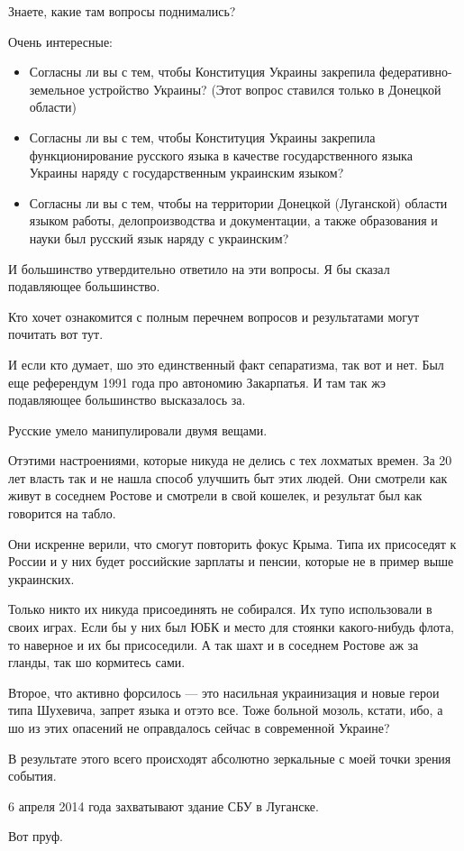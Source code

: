 Знаете, какие там вопросы поднимались?

Очень интересные:	

\begin{itemize} %

\item Согласны ли вы с тем, чтобы Конституция Украины закрепила
федеративно-земельное устройство Украины? (Этот вопрос ставился только в
Донецкой области)

\item Согласны ли вы с тем, чтобы Конституция Украины закрепила
функционирование русского языка в качестве государственного языка Украины
наряду с государственным украинским языком?

\item Согласны ли вы с тем, чтобы на территории Донецкой (Луганской) области
языком работы, делопроизводства и документации, а также образования и науки был
русский язык наряду с украинским?

\end{itemize} %

И большинство утвердительно ответило на эти вопросы. Я бы сказал подавляющее
большинство.

Кто хочет ознакомится с полным перечнем вопросов и результатами могут почитать
вот тут.

И если кто думает, шо это единственный факт сепаратизма, так вот и нет. Был еще
референдум 1991 года про автономию Закарпатья. И там так жэ подавляющее
большинство высказалось за.

Русские умело манипулировали двумя вещами.

Отэтими настроениями, которые никуда не делись с тех лохматых времен. За 20 лет
власть так и не нашла способ улучшить быт этих людей. Они смотрели как живут в
соседнем Ростове и смотрели в свой кошелек, и результат был как говорится на
табло.

Они искренне верили, что смогут повторить фокус Крыма. Типа их присоседят к
России и у них будет российские зарплаты и пенсии, которые не в пример выше
украинских.

Только никто их никуда присоединять не собирался. Их тупо использовали в своих
играх. Если бы у них был ЮБК и место для стоянки какого-нибудь флота, то
наверное и их бы присоседили. А так шахт и в соседнем Ростове аж за гланды, так
шо кормитесь сами.

Второе, что активно форсилось — это насильная украинизация и новые герои типа
Шухевича, запрет языка и отэто все. Тоже больной мозоль, кстати, ибо, а шо из
этих опасений не оправдалось сейчас в современной Украине?

В результате этого всего происходят абсолютно зеркальные с моей точки зрения
события.

6 апреля 2014 года захватывают здание СБУ в Луганске.

Вот пруф.
